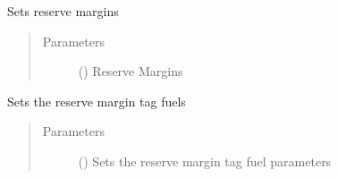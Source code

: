 \documentclass[a4paper,12pt,english]{article}
\begin{document}
\begin{fulllineitems}
\begin{fulllineitems}
\begin{quote}
\begin{description}
\end{description}\end{quote}

\end{fulllineitems}


\begin{fulllineitems}
\label{\detokenize{GOCPI:GOCPI.CreateCases.CreateCases.set_reserve_margin}}
Sets reserve margins
\begin{quote}\begin{description}
\item[{Parameters}] \leavevmode
{} (\sphinxstyleliteralemphasis{\sphinxupquote{, }}) \textendash{} Reserve Margins

\end{description}\end{quote}

\end{fulllineitems}


\begin{fulllineitems}
\label{\detokenize{GOCPI:GOCPI.CreateCases.CreateCases.set_reserve_margin_tag_fuel}}
Sets the reserve margin tag fuels
\begin{quote}\begin{description}
\item[{Parameters}] \leavevmode
{} (\sphinxstyleliteralemphasis{\sphinxupquote{, }}) \textendash{} Sets the reserve margin tag fuel parameters

\end{description}\end{quote}


\end{fulllineitems}
\end{fulllineitems}
\end{document}
